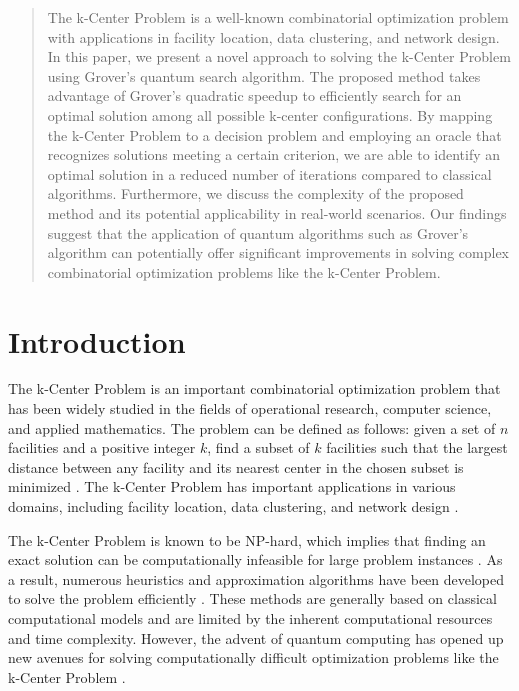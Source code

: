 \begin{abstract}
The k-Center Problem is a well-known combinatorial optimization problem with applications in facility location, data clustering, and network design. In this paper, we present a novel approach to solving the k-Center Problem using Grover's quantum search algorithm. The proposed method takes advantage of Grover's quadratic speedup to efficiently search for an optimal solution among all possible k-center configurations. By mapping the k-Center Problem to a decision problem and employing an oracle that recognizes solutions meeting a certain criterion, we are able to identify an optimal solution in a reduced number of iterations compared to classical algorithms. Furthermore, we discuss the complexity of the proposed method and its potential applicability in real-world scenarios. Our findings suggest that the application of quantum algorithms such as Grover's algorithm can potentially offer significant improvements in solving complex combinatorial optimization problems like the k-Center Problem.
\end{abstract}

\section{Introduction}
\label{sec:introduction}

The k-Center Problem is an important combinatorial optimization problem that has been widely studied in the fields of operational research, computer science, and applied mathematics. The problem can be defined as follows: given a set of $n$ facilities and a positive integer $k$, find a subset of $k$ facilities such that the largest distance between any facility and its nearest center in the chosen subset is minimized \cite{hochbaum1985best}. The k-Center Problem has important applications in various domains, including facility location, data clustering, and network design \cite{daskin2013network}.

The k-Center Problem is known to be NP-hard, which implies that finding an exact solution can be computationally infeasible for large problem instances \cite{kariv1979algorithm}. As a result, numerous heuristics and approximation algorithms have been developed to solve the problem efficiently \cite{gonzalez1985clustering, tushar2017recent}. These methods are generally based on classical computational models and are limited by the inherent computational resources and time complexity. However, the advent of quantum computing has opened up new avenues for solving computationally difficult optimization problems like the k-Center Problem \cite{nielsen2010quantum}.

